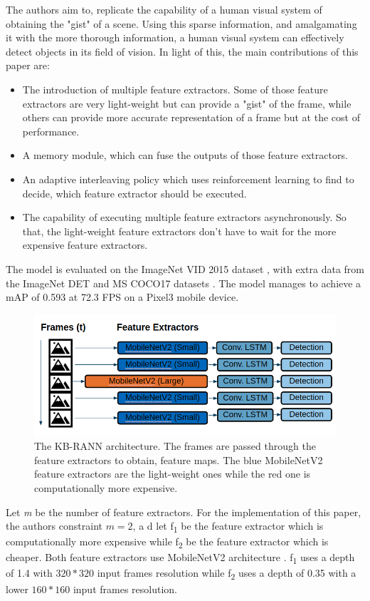 \documentclass[conference]{IEEEtran}
\begin{document}
The authors aim to, replicate the capability of a human visual system of obtaining the "gist" of a scene. Using this sparse information, and amalgamating it with the more thorough information, a human visual system can effectively detect objects in its field of vision. In light of this, the main contributions of this paper are:
\begin{itemize}
	\item The introduction of multiple feature extractors. Some of those feature extractors are very light-weight but can provide a "gist" of the frame, while others can provide more accurate representation of a frame but at the cost of performance.
	\item A memory module, which can fuse the outputs of those feature extractors.
	\item An adaptive interleaving policy which uses reinforcement learning to find to decide, which feature extractor should be executed.
	\item The capability of executing multiple feature extractors asynchronously. So that, the light-weight feature extractors don't have to wait for the more expensive feature extractors.
\end{itemize}
The model is evaluated on the ImageNet VID 2015 dataset \cite{b35}, with extra data from the ImageNet DET \cite{b35} and MS COCO17 datasets \cite{b31}. The model manages to achieve a mAP of 0.593 at 72.3 FPS on a Pixel3 mobile device. \newline

\begin{figure}[h]
\includegraphics[width=\columnwidth]{looking-fast-and-slow-architecture}
\caption{The KB-RANN architecture. The frames are passed through the feature extractors to obtain, feature maps. The blue MobileNetV2 feature extractors are the light-weight ones while the red one is computationally more expensive.}
\end{figure}

Let \textit{m} be the number of feature extractors. For the implementation of this paper, the authors constraint $\textit{m}=2$, a d let f\textsubscript{1} be the feature extractor which is computationally more expensive while f\textsubscript{2} be the feature extractor which is cheaper. Both feature extractors use MobileNetV2 architecture \cite{b36}. f\textsubscript{1} uses a depth of 1.4 with $320*320$ input frames resolution while f\textsubscript{2} uses a depth of 0.35 with a lower $160*160$ input frames resolution. \newline
\end{document}
